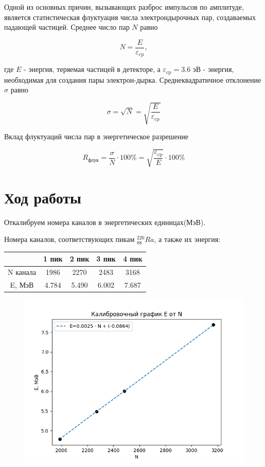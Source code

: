 \documentclass[a4paper,12pt]{article}
\begin{document}
Одной из основных причин, вызывающих разброс импульсов по амплитуде, является статистическая флуктуация числа электрондырочных пар, создаваемых падающей частицей. Среднее число пар $N$ равно

\[N = \frac{E}{\varepsilon_{\text{cp}}},\]

где $E$ - энергия, теряемая частицей в детекторе, а $\varepsilon_{\text{cp}}=3.6$ эВ - энергия, необходимая для создания пары электрон-дырка. Среднеквадратичное отклонение $\sigma$ равно

\[\sigma =\sqrt{N}=\sqrt{\frac{E}{\varepsilon_{\text{cp}}}}\]

Вклад флуктуаций числа пар в энергетическое разрешение

\[R_{\text{флук}} =\frac{\sigma}{N} \cdot 100 \% = \sqrt{\frac{\varepsilon_{\text{cp}}}{E}} \cdot 100 \%\]

\newpage
\section*{Ход работы}
Откалибруем номера каналов в энергетических единицах(МэВ).

Номера каналов, соответствующих пикам $^{226}_{88}Ra$, а также их энергия:
\begin{table}[H]
\centering
\begin{tabular}{|c|c|c|c|c|}
\hline
 & 1 пик & 2 пик & 3 пик & 4 пик \\
\hline
N канала & 1986 & 2270 & 2483 & 3168 \\
\hline
E, МэВ & 4.784 & 5.490 & 6.002 & 7.687 \\
\hline
\end{tabular}
\end{table}

\begin{figure}[H]
\centering
\includegraphics[scale=1]{graph1.png}
\end{figure}
\end{document}
